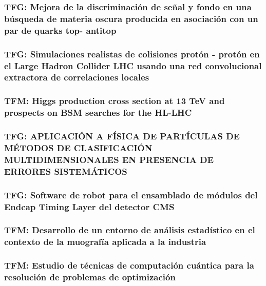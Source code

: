 \documentclass[a4paper, 11pt, twoside, openright]{report}
\begin{document}
\subsubsection{TFG: Mejora de la discriminación de señal y fondo en una búsqueda de materia oscura producida en asociación con un par de quarks top- antitop}


\subsubsection{TFG: Simulaciones realistas de colisiones protón - protón en el Large Hadron Collider LHC usando una red convolucional extractora de correlaciones locales}


\subsubsection{TFM: Higgs production cross section at 13 TeV and prospects on BSM searches for the HL-LHC}


\subsubsection{TFG: APLICACIÓN A FÍSICA DE PARTÍCULAS DE MÉTODOS DE CLASIFICACIÓN MULTIDIMENSIONALES EN PRESENCIA DE ERRORES SISTEMÁTICOS}


\subsubsection{TFG: Software de robot para el ensamblado de módulos del Endcap Timing Layer del detector CMS}


\subsubsection{TFM: Desarrollo de un entorno de análisis estadístico en el contexto de la muografía aplicada a la industria}


\subsubsection{TFM: Estudio de técnicas de computación cuántica para la resolución de problemas de optimización}

\end{document}
